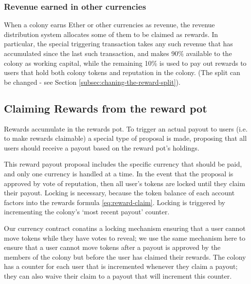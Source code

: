 \subsubsection*{Revenue earned in other currencies}
When a colony earns Ether or other currencies as revenue, the revenue distribution system allocates some of them to be claimed as rewards. In particular, the special triggering transaction takes any such revenue that has accumulated since the last such transaction, and makes 90\% available to the colony as working capital, while the remaining 10\% is used to pay out rewards to users that hold both colony tokens and reputation in the colony. (The split can be changed - see Section \ref{subsec:chaning-the-reward-split}).

\begin{center}
\end{center}

\subsection{Claiming Rewards from the reward pot}
Rewards accumulate in the rewards pot. To trigger an actual payout to users (i.e. to make rewards claimable) a special type of proposal is made, proposing that all users should receive a payout based on the reward pot's holdings. 

This reward payout proposal includes the specific currency that should be paid, and only one currency is handled at a time. In the event that the proposal is approved by vote of reputation, then all user's tokens are locked until they claim their payout. Locking is necessary, because the token balance of each account factors into the rewards formula \eqref{eq:reward-claim}. Locking is triggered by incrementing the colony's `most recent payout' counter. 

Our currency contract conatins a locking mechanism ensuring that a user cannot move tokens while they have votes to reveal; we use the same mechanism here to ensure that a user cannot move tokens after a payout is approved by the members of the colony but before the user has claimed their rewards. The colony has a counter for each user that is incremented whenever they claim a payout; they can also waive their claim to a payout that will increment this counter.  

